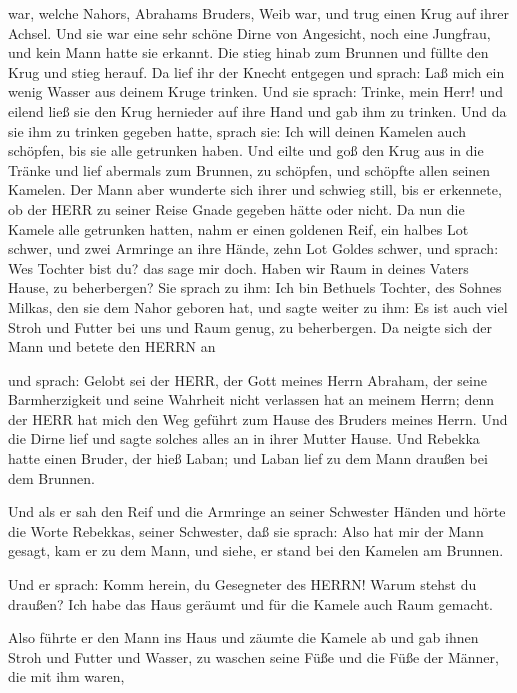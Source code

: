 war, welche Nahors, Abrahams Bruders, Weib war, und trug einen Krug auf
ihrer Achsel.  Und sie war eine sehr schöne Dirne von
Angesicht, noch eine Jungfrau, und kein Mann hatte sie erkannt. Die
stieg hinab zum Brunnen und füllte den Krug und stieg herauf.
 Da lief ihr der Knecht entgegen und sprach: Laß mich ein
wenig Wasser aus deinem Kruge trinken.  Und sie sprach:
Trinke, mein Herr! und eilend ließ sie den Krug hernieder auf ihre Hand
und gab ihm zu trinken.  Und da sie ihm zu trinken gegeben
hatte, sprach sie: Ich will deinen Kamelen auch schöpfen, bis sie alle
getrunken haben.  Und eilte und goß den Krug aus in die
Tränke und lief abermals zum Brunnen, zu schöpfen, und schöpfte allen
seinen Kamelen.  Der Mann aber wunderte sich ihrer und
schwieg still, bis er erkennete, ob der HERR zu seiner Reise Gnade
gegeben hätte oder nicht.  Da nun die Kamele alle getrunken
hatten, nahm er einen goldenen Reif, ein halbes Lot schwer, und zwei
Armringe an ihre Hände, zehn Lot Goldes schwer,  und
sprach: Wes Tochter bist du? das sage mir doch. Haben wir Raum in deines
Vaters Hause, zu beherbergen?  Sie sprach zu ihm: Ich bin
Bethuels Tochter, des Sohnes Milkas, den sie dem Nahor geboren hat,
 und sagte weiter zu ihm: Es ist auch viel Stroh und Futter
bei uns und Raum genug, zu beherbergen.  Da neigte sich der
Mann und betete den HERRN an

 und sprach: Gelobt sei der HERR, der Gott meines Herrn
Abraham, der seine Barmherzigkeit und seine Wahrheit nicht verlassen hat
an meinem Herrn; denn der HERR hat mich den Weg geführt zum Hause des
Bruders meines Herrn.  Und die Dirne lief und sagte solches
alles an in ihrer Mutter Hause.  Und Rebekka hatte einen
Bruder, der hieß Laban; und Laban lief zu dem Mann draußen bei dem
Brunnen.

 Und als er sah den Reif und die Armringe an seiner
Schwester Händen und hörte die Worte Rebekkas, seiner Schwester, daß sie
sprach: Also hat mir der Mann gesagt, kam er zu dem Mann, und siehe, er
stand bei den Kamelen am Brunnen.

 Und er sprach: Komm herein, du Gesegneter des HERRN! Warum
stehst du draußen? Ich habe das Haus geräumt und für die Kamele auch
Raum gemacht.

 Also führte er den Mann ins Haus und zäumte die Kamele ab
und gab ihnen Stroh und Futter und Wasser, zu waschen seine Füße und die
Füße der Männer, die mit ihm waren,

